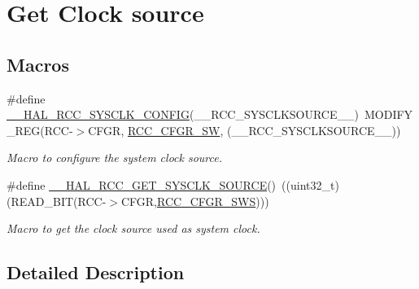 \hypertarget{group___r_c_c___get___clock__source}{\section{Get Clock source}
\label{group___r_c_c___get___clock__source}
}
\subsection*{Macros}
\begin{DoxyCompactItemize}
\item 
\#define \hyperlink{group___r_c_c___get___clock__source_ga32f72b8c5b7e97b415867c57f9fafed6}{\-\_\-\-\_\-\-H\-A\-L\-\_\-\-R\-C\-C\-\_\-\-S\-Y\-S\-C\-L\-K\-\_\-\-C\-O\-N\-F\-I\-G}(\-\_\-\-\_\-\-R\-C\-C\-\_\-\-S\-Y\-S\-C\-L\-K\-S\-O\-U\-R\-C\-E\-\_\-\-\_\-)~M\-O\-D\-I\-F\-Y\-\_\-\-R\-E\-G(R\-C\-C-\/$>$C\-F\-G\-R, \hyperlink{group___peripheral___registers___bits___definition_ga0eea5e5f7743a7e8995b8beeb18355c1}{R\-C\-C\-\_\-\-C\-F\-G\-R\-\_\-\-S\-W}, (\-\_\-\-\_\-\-R\-C\-C\-\_\-\-S\-Y\-S\-C\-L\-K\-S\-O\-U\-R\-C\-E\-\_\-\-\_\-))
\begin{DoxyCompactList}\small\item\em Macro to configure the system clock source. \end{DoxyCompactList}\item 
\#define \hyperlink{group___r_c_c___get___clock__source_gac99c2453d9e77c8b457acc0210e754c2}{\-\_\-\-\_\-\-H\-A\-L\-\_\-\-R\-C\-C\-\_\-\-G\-E\-T\-\_\-\-S\-Y\-S\-C\-L\-K\-\_\-\-S\-O\-U\-R\-C\-E}()~((uint32\-\_\-t)(R\-E\-A\-D\-\_\-\-B\-I\-T(R\-C\-C-\/$>$C\-F\-G\-R,\hyperlink{group___peripheral___registers___bits___definition_ga15bf2269500dc97e137315f44aa015c9}{R\-C\-C\-\_\-\-C\-F\-G\-R\-\_\-\-S\-W\-S})))
\begin{DoxyCompactList}\small\item\em Macro to get the clock source used as system clock. \end{DoxyCompactList}\end{DoxyCompactItemize}


\subsection{Detailed Description}


